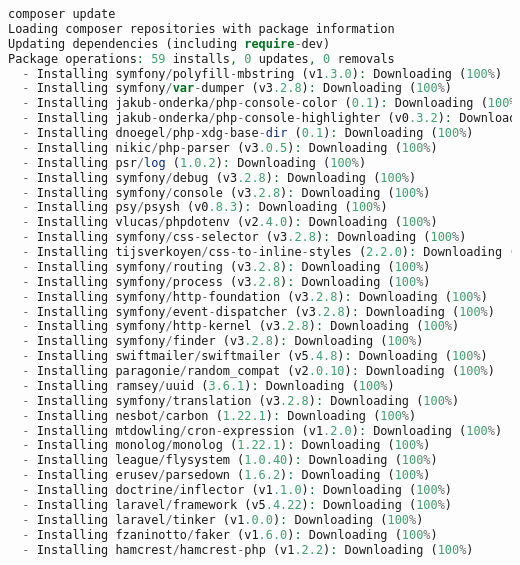 \begin{lstlisting}[language=PHP]
composer update
Loading composer repositories with package information
Updating dependencies (including require-dev)
Package operations: 59 installs, 0 updates, 0 removals
  - Installing symfony/polyfill-mbstring (v1.3.0): Downloading (100%)         
  - Installing symfony/var-dumper (v3.2.8): Downloading (100%)         
  - Installing jakub-onderka/php-console-color (0.1): Downloading (100%)         
  - Installing jakub-onderka/php-console-highlighter (v0.3.2): Downloading (100%)         
  - Installing dnoegel/php-xdg-base-dir (0.1): Downloading (100%)         
  - Installing nikic/php-parser (v3.0.5): Downloading (100%)         
  - Installing psr/log (1.0.2): Downloading (100%)         
  - Installing symfony/debug (v3.2.8): Downloading (100%)         
  - Installing symfony/console (v3.2.8): Downloading (100%)         
  - Installing psy/psysh (v0.8.3): Downloading (100%)         
  - Installing vlucas/phpdotenv (v2.4.0): Downloading (100%)         
  - Installing symfony/css-selector (v3.2.8): Downloading (100%)         
  - Installing tijsverkoyen/css-to-inline-styles (2.2.0): Downloading (100%)         
  - Installing symfony/routing (v3.2.8): Downloading (100%)         
  - Installing symfony/process (v3.2.8): Downloading (100%)         
  - Installing symfony/http-foundation (v3.2.8): Downloading (100%)         
  - Installing symfony/event-dispatcher (v3.2.8): Downloading (100%)         
  - Installing symfony/http-kernel (v3.2.8): Downloading (100%)         
  - Installing symfony/finder (v3.2.8): Downloading (100%)         
  - Installing swiftmailer/swiftmailer (v5.4.8): Downloading (100%)         
  - Installing paragonie/random_compat (v2.0.10): Downloading (100%)         
  - Installing ramsey/uuid (3.6.1): Downloading (100%)         
  - Installing symfony/translation (v3.2.8): Downloading (100%)         
  - Installing nesbot/carbon (1.22.1): Downloading (100%)         
  - Installing mtdowling/cron-expression (v1.2.0): Downloading (100%)         
  - Installing monolog/monolog (1.22.1): Downloading (100%)         
  - Installing league/flysystem (1.0.40): Downloading (100%)         
  - Installing erusev/parsedown (1.6.2): Downloading (100%)         
  - Installing doctrine/inflector (v1.1.0): Downloading (100%)         
  - Installing laravel/framework (v5.4.22): Downloading (100%)         
  - Installing laravel/tinker (v1.0.0): Downloading (100%)         
  - Installing fzaninotto/faker (v1.6.0): Downloading (100%)         
  - Installing hamcrest/hamcrest-php (v1.2.2): Downloading (100%)         

\end{lstlisting}
